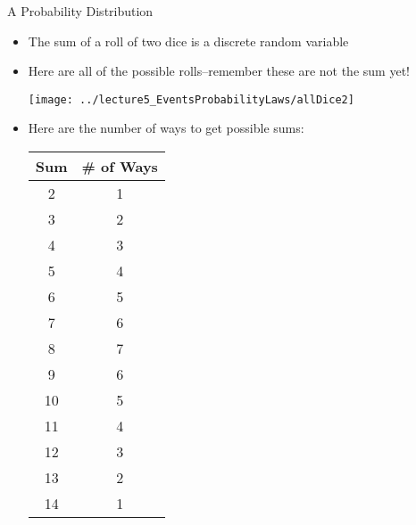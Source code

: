 \documentclass[xcolor=dvipsnames]{beamer}
\begin{document}
\begin{frame}{A Probability Distribution}
	\begin{itemize}
		\item The sum of a roll of two dice is a discrete random variable
		\item Here are all of the possible rolls--remember these are not the sum yet!
		\begin{center}
			\texttt{[image: ../lecture5\_EventsProbabilityLaws/allDice2]}
		\end{center}
		\item Here are the number of ways to get possible sums:
		{ \tiny
		\begin{center}
			\begin{tabular}{|c|c|} \hline
					\textbf{Sum} & \textbf{\# of Ways} \\ \hline \hline
				      2 &    1\\ \hline
				     3  &   2\\ \hline
				     4  &   3\\ \hline
				     5  &   4\\ \hline
				     6  &   5\\ \hline
				     7  &   6\\ \hline
				     8  &   7\\ \hline
				     9  &   6\\ \hline
				    10  &   5\\ \hline
				    11  &   4\\ \hline
				    12  &   3\\ \hline
				    13  &   2\\ \hline
				    14  &   1\\ \hline
			\end{tabular}
		\end{center}}
	\end{itemize}
\end{frame}
\end{document}
